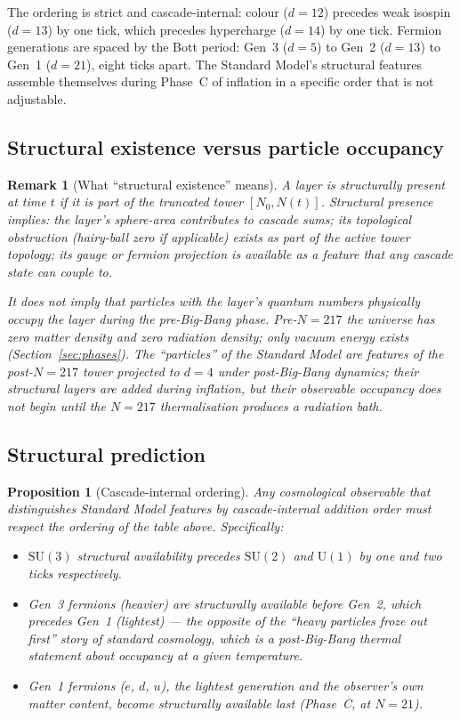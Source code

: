\documentclass[12pt,a4paper]{article}
\newtheorem{proposition}[theorem]{Proposition}
\newtheorem*{remark}{Remark}
\begin{document}
The ordering is strict and cascade-internal: colour ($d = 12$) precedes weak
isospin ($d = 13$) by one tick, which precedes hypercharge ($d = 14$) by one
tick. Fermion generations are spaced by the Bott period: Gen~3 ($d = 5$) to
Gen~2 ($d = 13$) to Gen~1 ($d = 21$), eight ticks apart. The Standard Model's
structural features assemble themselves during Phase~C of inflation in a
specific order that is not adjustable.

\subsection{Structural existence versus particle occupancy}

\begin{remark}[What ``structural existence'' means]
A layer is \emph{structurally present} at time $t$ if it is part of the
truncated tower $[N_0, N(t)]$. Structural presence implies: the layer's
sphere-area contributes to cascade sums; its topological obstruction (hairy-ball
zero if applicable) exists as part of the active tower topology; its gauge or
fermion projection is available as a feature that any cascade state can couple
to.

It does \emph{not} imply that particles with the layer's quantum numbers
physically occupy the layer during the pre-Big-Bang phase. Pre-$N = 217$ the
universe has zero matter density and zero radiation density; only vacuum energy
exists (Section~\ref{sec:phases}). The ``particles'' of the Standard Model are
features of the \emph{post}-$N = 217$ tower projected to $d = 4$ under
post-Big-Bang dynamics; their structural layers are added during inflation, but
their observable occupancy does not begin until the $N = 217$ thermalisation
produces a radiation bath.
\end{remark}

\subsection{Structural prediction}

\begin{proposition}[Cascade-internal ordering]\label{prop:ordering}
Any cosmological observable that distinguishes Standard Model features by
cascade-internal addition order must respect the ordering of the table above.
Specifically:
\begin{itemize}[nosep]
\item $\mathrm{SU}(3)$ structural availability precedes $\mathrm{SU}(2)$ and
$\mathrm{U}(1)$ by one and two ticks respectively.
\item Gen~3 fermions (heavier) are structurally available before Gen~2, which
precedes Gen~1 (lightest) --- the opposite of the ``heavy particles froze out
first'' story of standard cosmology, which is a post-Big-Bang thermal
statement about occupancy at a given temperature.
\item Gen~1 fermions ($e$, $d$, $u$), the lightest generation and the observer's
own matter content, become structurally available last (Phase~C, at $N = 21$).
\end{itemize}
\end{proposition}
\end{document}
